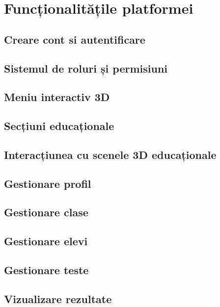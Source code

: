 
\chapter{Funcționalitățile platformei}
\label{chapter:funcionalitati}
\section{Creare cont si autentificare}
\section{Sistemul de roluri și permisiuni}
\section{Meniu interactiv 3D}
\section{Secțiuni educaționale}
\section{Interacțiunea cu scenele 3D educaționale}
\section{Gestionare profil}
\section{Gestionare clase}
\section{Gestionare elevi}
\section{Gestionare teste}
\section{Vizualizare rezultate}